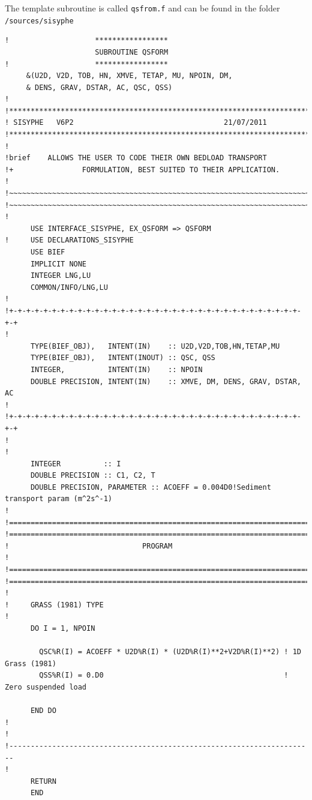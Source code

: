 The template subroutine is called \texttt{qsfrom.f} and can be found in the folder \texttt{/sources/sisyphe}
\begin{lstlisting}[frame=trBL]
!                    ***************** 
                     SUBROUTINE QSFORM 
!                    ***************** 
     &(U2D, V2D, TOB, HN, XMVE, TETAP, MU, NPOIN, DM,  
     & DENS, GRAV, DSTAR, AC, QSC, QSS) 
! 
!***********************************************************************
! SISYPHE   V6P2                                   21/07/2011 
!***********************************************************************
! 
!brief    ALLOWS THE USER TO CODE THEIR OWN BEDLOAD TRANSPORT 
!+                FORMULATION, BEST SUITED TO THEIR APPLICATION. 
! 
!~~~~~~~~~~~~~~~~~~~~~~~~~~~~~~~~~~~~~~~~~~~~~~~~~~~~~~~~~~~~~~~~~~~~~~~
!~~~~~~~~~~~~~~~~~~~~~~~~~~~~~~~~~~~~~~~~~~~~~~~~~~~~~~~~~~~~~~~~~~~~~~~
! 
      USE INTERFACE_SISYPHE, EX_QSFORM => QSFORM 
!     USE DECLARATIONS_SISYPHE 
      USE BIEF 
      IMPLICIT NONE 
      INTEGER LNG,LU 
      COMMON/INFO/LNG,LU 
! 
!+-+-+-+-+-+-+-+-+-+-+-+-+-+-+-+-+-+-+-+-+-+-+-+-+-+-+-+-+-+-+-+-+-+-+-+
! 
      TYPE(BIEF_OBJ),   INTENT(IN)    :: U2D,V2D,TOB,HN,TETAP,MU 
      TYPE(BIEF_OBJ),   INTENT(INOUT) :: QSC, QSS 
      INTEGER,          INTENT(IN)    :: NPOIN 
      DOUBLE PRECISION, INTENT(IN)    :: XMVE, DM, DENS, GRAV, DSTAR, AC
! 
!+-+-+-+-+-+-+-+-+-+-+-+-+-+-+-+-+-+-+-+-+-+-+-+-+-+-+-+-+-+-+-+-+-+-+-+
! 
! 
      INTEGER          :: I 
      DOUBLE PRECISION :: C1, C2, T 
      DOUBLE PRECISION, PARAMETER :: ACOEFF = 0.004D0!Sediment transport param (m^2s^-1)
! 
!======================================================================!
!======================================================================!
!                               PROGRAM                                !
!======================================================================!
!======================================================================!
! 
!     GRASS (1981) TYPE 
!      
      DO I = 1, NPOIN 
 
        QSC%R(I) = ACOEFF * U2D%R(I) * (U2D%R(I)**2+V2D%R(I)**2) ! 1D Grass (1981)  
        QSS%R(I) = 0.D0                                          ! Zero suspended load
 
      END DO 
! 
! 
!-----------------------------------------------------------------------
! 
      RETURN 
      END
\end{lstlisting}      


